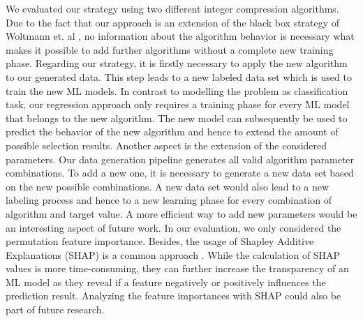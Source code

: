 We evaluated our strategy using two different integer compression algorithms. Due to the fact that our approach is an extension of the black box strategy of Woltmann et. al \cite{Woltmann2021}, no information about the algorithm behavior is necessary what makes it possible to add further algorithms without a complete new training phase. Regarding our strategy, it is firstly necessary to apply the new algorithm to our generated data. This step leads to a new labeled data set which is used to train the new ML models. In contrast to modelling the problem as classification task, our regression approach only requires a training phase for every ML model that belongs to the new algorithm. 
The new model can subsequently be used to predict the behavior of the new algorithm and hence to extend the amount of possible selection results.
Another aspect is the extension of the considered parameters. Our data generation pipeline generates all valid algorithm parameter combinations. To add a new one, it is necessary to generate a new data set based on the new possible combinations. A new data set would also lead to a new labeling process and hence to a new learning phase for every combination of algorithm and target value. A more efficient way to add new parameters would be an interesting aspect of future work. In our evaluation, we only considered the permutation feature importance. Besides, the usage of Shapley Additive Explanations (SHAP) is a common approach \cite{Lundberg2017}. While the calculation of SHAP values is more time-consuming, they can further increase the transparency of an ML model as they reveal if a feature negatively or positively influences the prediction result. Analyzing the feature importances with SHAP could also be part of future research.
